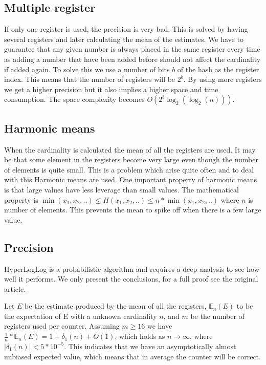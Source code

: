 \subsection{Multiple register}
If only one register is used, the precision is very bad. This is solved by having several registers and later calculating the mean of the estimates. We have to guarantee that any given number is always placed in the same register every time as adding a number that have been added before should not affect the cardinality if added again. To solve this we use a number of bits $b$ of the hash as the register index. This means that the number of registers will be $2^b$. By using more registers we get a higher precision but it also implies a higher space and time consumption. The space complexity becomes $O(2^b\log_2(\log_2(n)))$. \cite{hyperloglog} 

\subsection{Harmonic means}
When the cardinality is calculated the mean of all the registers are used. It may be that some element in the registers become very large even though the number of elements is quite small. This is a problem which arise quite often and to deal with this Harmonic means are used. One important property of harmonic means is that large values have less leverage than small values. The mathematical property is $\min(x_1,x_2,..) \leq H(x_1,x_2,..) \leq n*\min(x_1,x_2,..)$ where $n$ is number of elements. This prevents the mean to spike off when there is a few large value.  

\subsection{Precision}
HyperLogLog is a probabilistic algorithm and requires a deep analysis to see how well it performs. We only present the conclusions, for a full proof see the original article. 

Let $E$ be the estimate produced by the mean of all the registers, $\mathbb{E}_n(E)$ to be the expectation of E with a unknown cardinality $n$, and $m$ be the number of registers used per counter. Assuming $m \geq 16$ we have $\frac{1}{n}*\mathbb{E}_n(E) = 1 + \delta_1(n) + O(1)$, which holds as $n \rightarrow \infty$, where $|\delta_1(n)| < 5*10^{-5}$. This indicates that we have an asymptotically almost unbiased expected value, which means that in average the counter will be correct. 

